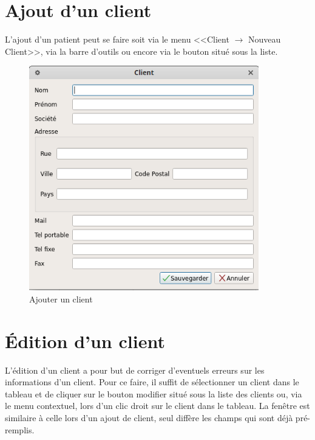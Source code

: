 \section{Ajout d'un client}
L'ajout d’un patient peut se faire soit via le menu <<Client $\rightarrow$ Nouveau Client>>, via la barre d'outils ou encore via le bouton situé sous la
liste. 
\begin{figure}[H]
	\centering
	\includegraphics[width=10cm]{screens/ajouterClient.png}
	\caption{Ajouter un client}
\end{figure}

\section{Édition d'un client}
L’édition d’un client a pour but de corriger d’eventuels erreurs sur les informations d’un client. Pour ce faire, il suffit de sélectionner
un client dans le tableau et de cliquer sur le bouton modifier situé sous la liste des clients ou, via le menu contextuel, lors d’un clic
droit sur le client dans le tableau. 
 La fenêtre est similaire à celle lors d’un ajout de client, seul diffère les champs qui sont déjà pré-remplis. 


